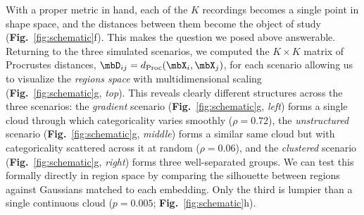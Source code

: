 With a proper metric in hand, each of the $K$ recordings becomes a single point in shape space, and the distances between them become the object of study (\textbf{Fig.}~\ref{fig:schematic}f). This makes the question we posed above answerable. Returning to the three simulated scenarios, we computed the $K \times K$ matrix of Procrustes distances, $\mbD_{ij} = d_{\text{Proc}}(\mbX_i, \mbX_j)$, for each scenario allowing us to visualize the \textit{regions space} with multidimensional scaling (\textbf{Fig.}~\ref{fig:schematic}g, \textit{top}). This reveals clearly different structures across the three scenarios: the \textit{gradient} scenario (\textbf{Fig.}~\ref{fig:schematic}g, \textit{left}) forms a single cloud through which categoricality varies smoothly ($\rho = 0.72$), the \textit{unstructured} scenario (\textbf{Fig.}~\ref{fig:schematic}g, \textit{middle}) forms a similar same cloud but with categoricality scattered across it at random ($\rho = 0.06$), and the \textit{clustered} scenario (\textbf{Fig.}~\ref{fig:schematic}g, \textit{right}) forms three well-separated groups. We can test this formally directly in region space by comparing the silhouette between regions against Gaussians matched to each embedding. Only the third is lumpier than a single continuous cloud ($p = 0.005$; \textbf{Fig.}~\ref{fig:schematic}h).

